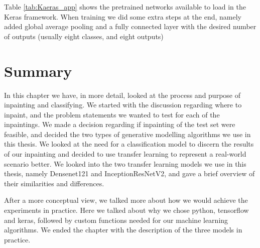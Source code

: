 Table \ref{tab:Kaeras_app} shows the pretrained networks available to load in the Keras framework. 
When training we did some extra steps at the end, namely added global average pooling and a fully connected layer with the desired number of outputs (usually eight classes, and eight outputs)


\section{Summary}
In this chapter we have, in more detail, looked at the process and purpose of inpainting and classifying.
We started with the discussion regarding where to inpaint, and the problem statements we wanted to test for each of the inpaintings. 
We made a decision regarding if inpainting of the test set were feasible, and decided the two types of generative modelling algorithms we use in this thesis. 
We looked at the need for a classification model to discern the results of our inpainting and decided to use transfer learning to represent a real-world scenario better.
We looked into the two transfer learning models we use in this thesis, namely Densenet121 and InceptionResNetV2, and gave a brief overview of their similarities and differences.

After a more conceptual view, we talked more about how we would achieve the experiments in practice.  Here we talked about why we chose python, tensorflow and keras, followed by custom functions needed for our machine learning algorithms. 
We ended the chapter with the description of the three models in practice.

 
